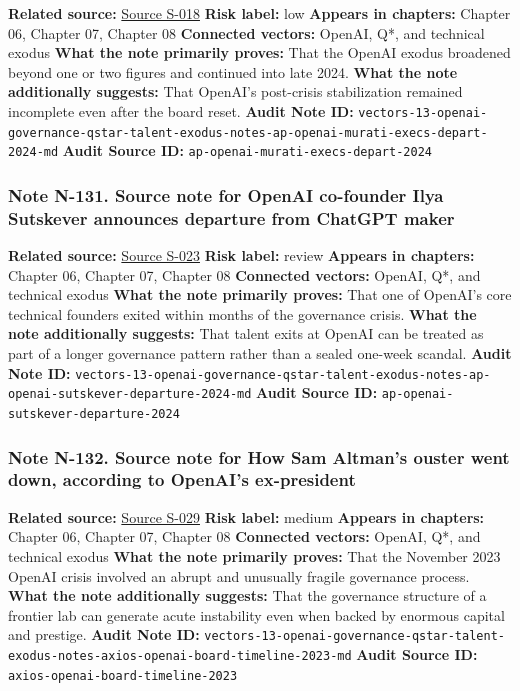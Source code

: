 \documentclass[
  american,
  11pt,
  letterpaper,
]{article}
\begin{document}
\textbf{Related source:}
\hyperref[source-s-018-openai-chief-technology-officer-mira-murati-and-2-other-execs-are-leaving-the-chatgpt-maker]{Source
S-018} \textbf{Risk label:} low \textbf{Appears in chapters:} Chapter
06, Chapter 07, Chapter 08 \textbf{Connected vectors:} OpenAI, Q*, and
technical exodus \textbf{What the note primarily proves:} That the
OpenAI exodus broadened beyond one or two figures and continued into
late 2024. \textbf{What the note additionally suggests:} That OpenAI's
post-crisis stabilization remained incomplete even after the board
reset. \textbf{Audit Note ID:}
\texttt{vectors-13-openai-governance-qstar-talent-exodus-notes-ap-openai-murati-execs-depart-2024-md}
\textbf{Audit Source ID:} \texttt{ap-openai-murati-execs-depart-2024}

\subsubsection{Note N-131. Source note for OpenAI co-founder Ilya
Sutskever announces departure from ChatGPT
maker}\label{note-n-131-vectors-13-openai-governance-qstar-talent-exodus-notes-ap-openai-sutskever-departure-2024-md}

\textbf{Related source:}
\hyperref[source-s-023-openai-co-founder-ilya-sutskever-announces-departure-from-chatgpt-maker]{Source
S-023} \textbf{Risk label:} review \textbf{Appears in chapters:} Chapter
06, Chapter 07, Chapter 08 \textbf{Connected vectors:} OpenAI, Q*, and
technical exodus \textbf{What the note primarily proves:} That one of
OpenAI's core technical founders exited within months of the governance
crisis. \textbf{What the note additionally suggests:} That talent exits
at OpenAI can be treated as part of a longer governance pattern rather
than a sealed one-week scandal. \textbf{Audit Note ID:}
\texttt{vectors-13-openai-governance-qstar-talent-exodus-notes-ap-openai-sutskever-departure-2024-md}
\textbf{Audit Source ID:} \texttt{ap-openai-sutskever-departure-2024}

\subsubsection{Note N-132. Source note for How Sam Altman's ouster went
down, according to OpenAI's
ex-president}\label{note-n-132-vectors-13-openai-governance-qstar-talent-exodus-notes-axios-openai-board-timeline-2023-md}

\textbf{Related source:}
\hyperref[source-s-029-how-sam-altman-s-ouster-went-down-according-to-openai-s-ex-president]{Source
S-029} \textbf{Risk label:} medium \textbf{Appears in chapters:} Chapter
06, Chapter 07, Chapter 08 \textbf{Connected vectors:} OpenAI, Q*, and
technical exodus \textbf{What the note primarily proves:} That the
November 2023 OpenAI crisis involved an abrupt and unusually fragile
governance process. \textbf{What the note additionally suggests:} That
the governance structure of a frontier lab can generate acute
instability even when backed by enormous capital and prestige.
\textbf{Audit Note ID:}
\texttt{vectors-13-openai-governance-qstar-talent-exodus-notes-axios-openai-board-timeline-2023-md}
\textbf{Audit Source ID:} \texttt{axios-openai-board-timeline-2023}
\end{document}
